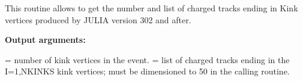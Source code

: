 \par
{}
\par
This routine allows to get the number and list of charged tracks ending in Kink vertices
produced by JULIA version 302 and after. 

\par
{\bf Output arguments:}
\begin{indentlist}{ 3.50cm}{ 3.75cm}
 = number of kink vertices in the event.
 = list of charged tracks ending in the I=1,NKINKS kink vertices; must be dimensioned
                            to 50 in the calling routine.
\end{indentlist}


